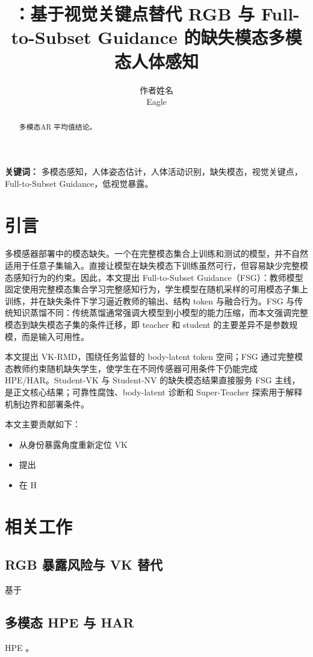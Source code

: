 \documentclass[UTF8,twocolumn]{ctexart}
\title{\method：基于视觉关键点替代 RGB 与 Full-to-Subset Guidance 的缺失模态多模态人体感知}
\author{作者姓名\\Eagle}
\date{}
\newcommand{\method}{VK-RMD}
\begin{document}
\maketitle

\begin{abstract}
多模态AR 平均值结论。
\end{abstract}

\textbf{关键词：} 多模态感知，人体姿态估计，人体活动识别，缺失模态，视觉关键点，Full-to-Subset Guidance，低视觉暴露。

\section{引言}
多模感器部署中的模态缺失。一个在完整模态集合上训练和测试的模型，并不自然适用于任意子集输入。直接让模型在缺失模态下训练虽然可行，但容易缺少完整模态感知行为的约束。因此，本文提出 Full-to-Subset Guidance（FSG）：教师模型固定使用完整模态集合学习完整感知行为，学生模型在随机采样的可用模态子集上训练，并在缺失条件下学习逼近教师的输出、结构 token 与融合行为。FSG 与传统知识蒸馏不同：传统蒸馏通常强调大模型到小模型的能力压缩，而本文强调完整模态到缺失模态子集的条件迁移，即 teacher 和 student 的主要差异不是参数规模，而是输入可用性。

本文提出 \method{}，围绕任务监督的 body-latent token 空间；FSG 通过完整模态教师约束随机缺失学生，使学生在不同传感器可用条件下仍能完成 HPE/HAR。Student-VK 与 Student-NV 的缺失模态结果直接服务 FSG 主线，是正文核心结果；可靠性腐蚀、body-latent 诊断和 Super-Teacher 探索用于解释机制边界和部署条件。

本文主要贡献如下：
\begin{itemize}
    \item 从身份暴露角度重新定位 VK
    \item 提出
    \item 在 H
\end{itemize}

\section{相关工作}
\subsection{RGB 暴露风险与 VK 替代}
基于

\subsection{多模态 HPE 与 HAR}
HPE 。
\end{document}
